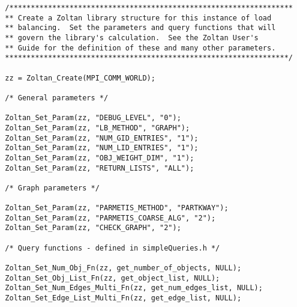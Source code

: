 \clearpage
\begin{flushleft}
\begin{verbatim}
  /******************************************************************
  ** Create a Zoltan library structure for this instance of load
  ** balancing.  Set the parameters and query functions that will
  ** govern the library's calculation.  See the Zoltan User's
  ** Guide for the definition of these and many other parameters.
  ******************************************************************/

  zz = Zoltan_Create(MPI_COMM_WORLD);

  /* General parameters */

  Zoltan_Set_Param(zz, "DEBUG_LEVEL", "0");
  Zoltan_Set_Param(zz, "LB_METHOD", "GRAPH");
  Zoltan_Set_Param(zz, "NUM_GID_ENTRIES", "1"); 
  Zoltan_Set_Param(zz, "NUM_LID_ENTRIES", "1");
  Zoltan_Set_Param(zz, "OBJ_WEIGHT_DIM", "1");
  Zoltan_Set_Param(zz, "RETURN_LISTS", "ALL");

  /* Graph parameters */

  Zoltan_Set_Param(zz, "PARMETIS_METHOD", "PARTKWAY"); 
  Zoltan_Set_Param(zz, "PARMETIS_COARSE_ALG", "2");
  Zoltan_Set_Param(zz, "CHECK_GRAPH", "2"); 

  /* Query functions - defined in simpleQueries.h */

  Zoltan_Set_Num_Obj_Fn(zz, get_number_of_objects, NULL);
  Zoltan_Set_Obj_List_Fn(zz, get_object_list, NULL);
  Zoltan_Set_Num_Edges_Multi_Fn(zz, get_num_edges_list, NULL);
  Zoltan_Set_Edge_List_Multi_Fn(zz, get_edge_list, NULL);
\end{verbatim}
\end{flushleft}

